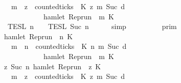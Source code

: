 \begin{isabellebody}
\ \ \ \ \ \ \ \ \ \ \ \ \ \ \ \ \ \ \ \ {\isacharparenleft}{\isasymforall}m\ {\isasymge}\ z{\isachardot}\ \ counted{\isacharunderscore}ticks\ {\isasymrho}\ K\ z\ m\ {\isacharparenleft}Suc\ d{\isacharparenright}\isanewline
\ \ \ \ \ \ \ \ \ \ \ \ \ \ \ \ \ \ \ \ \ \ \ \ \ \ \ \ {\isasymlongrightarrow}\ hamlet\ {\isacharparenleft}{\isacharparenleft}Rep{\isacharunderscore}run\ {\isasymrho}{\isacharparenright}\ m\ K\ {\isacharbraceright}\isanewline
\ \ \ \ \ \ \ \ \ \ \ \ \ \ \ \ {\isasyminter}\ {\isasymlbrakk}{\isasymlbrakk}\ {\isasymPsi}\ {\isasymrbrakk}{\isasymrbrakk}\isactrlsub T\isactrlsub E\isactrlsub S\isactrlsub L\isactrlbsup {\isasymge}\ n\isactrlesup \ {\isasyminter}\ {\isasymlbrakk}{\isasymlbrakk}\ {\isasymPhi}\ {\isasymrbrakk}{\isasymrbrakk}\isactrlsub T\isactrlsub E\isactrlsub S\isactrlsub L\isactrlbsup {\isasymge}\ Suc\ n\isactrlesup {\isacartoucheclose}\isanewline
\ \ \ \ \isamarkupfalse%
\ simp\isanewline
\ \ \isamarkupfalse%
\ \isamarkupfalse%
\ {\isacartoucheopen}{\isachardot}{\isachardot}{\isachardot}\ {\isacharequal}\ {\isasymlbrakk}{\isasymlbrakk}\ {\isasymGamma}\ {\isasymrbrakk}{\isasymrbrakk}\isactrlsub p\isactrlsub r\isactrlsub i\isactrlsub m\ \isanewline
\ \ \ \ \ \ \ \ \ \ \ \ \ \ \ \ {\isasyminter}\ {\isacharbraceleft}{\isasymrho}{\isachardot}\ hamlet\ {\isacharparenleft}{\isacharparenleft}Rep{\isacharunderscore}run\ {\isasymrho}{\isacharparenright}\ n\ K\ {\isasymlongrightarrow}\isanewline
\ \ \ \ \ \ \ \ \ \ \ \ \ \ \ \ \ \ \ \ {\isacharparenleft}{\isasymforall}m\ {\isasymge}\ n{\isachardot}\ \ counted{\isacharunderscore}ticks\ {\isasymrho}\ K\ n\ m\ {\isacharparenleft}Suc\ d{\isacharparenright}\isanewline
\ \ \ \ \ \ \ \ \ \ \ \ \ \ \ \ \ \ \ \ \ \ \ \ \ \ \ \ {\isasymlongrightarrow}\ hamlet\ {\isacharparenleft}{\isacharparenleft}Rep{\isacharunderscore}run\ {\isasymrho}{\isacharparenright}\ m\ K\ {\isacharbraceright}\isanewline
\ \ \ \ \ \ \ \ \ \ \ \ \ \ \ \ {\isasyminter}\ {\isacharbraceleft}{\isasymrho}{\isachardot}\ {\isasymforall}z{\isasymge}\ Suc\ n{\isachardot}\ hamlet\ {\isacharparenleft}{\isacharparenleft}Rep{\isacharunderscore}run\ {\isasymrho}{\isacharparenright}\ z\ K\ {\isasymlongrightarrow}\isanewline
\ \ \ \ \ \ \ \ \ \ \ \ \ \ \ \ \ \ \ \ {\isacharparenleft}{\isasymforall}m\ {\isasymge}\ z{\isachardot}\ \ counted{\isacharunderscore}ticks\ {\isasymrho}\ K\ z\ m\ {\isacharparenleft}Suc\ d{\isacharparenright}\isanewline

\end{isabellebody}
